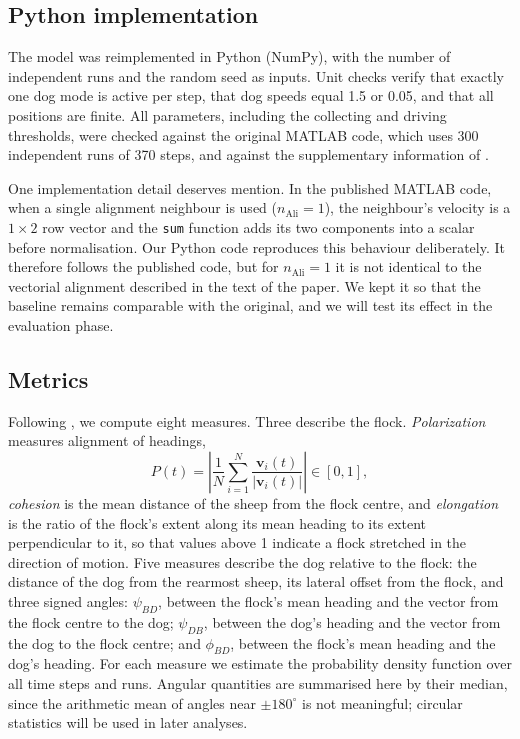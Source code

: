 \documentclass[9pt,twoside]{pnas-new}
\begin{document}
\subsection{Python implementation}
The model was reimplemented in Python (NumPy), with the number of independent runs and the random seed as inputs. Unit checks verify that exactly one dog mode is active per step, that dog speeds equal 1.5 or 0.05, and that all positions are finite. All parameters, including the collecting and driving thresholds, were checked against the original MATLAB code, which uses 300 independent runs of 370 steps, and against the supplementary information of \cite{jadhav2024}.

One implementation detail deserves mention. In the published MATLAB code, when a single alignment neighbour is used ($n_\mathrm{Ali}=1$), the neighbour's velocity is a $1\times2$ row vector and the \texttt{sum} function adds its two components into a scalar before normalisation. Our Python code reproduces this behaviour deliberately. It therefore follows the published code, but for $n_\mathrm{Ali}=1$ it is not identical to the vectorial alignment described in the text of the paper. We kept it so that the baseline remains comparable with the original, and we will test its effect in the evaluation phase.

\subsection{Metrics}
Following \cite{jadhav2024}, we compute eight measures. Three describe the flock. \emph{Polarization} measures alignment of headings,
\begin{equation}
P(t)=\left|\frac{1}{N}\sum_{i=1}^{N}\frac{\mathbf{v}_i(t)}{|\mathbf{v}_i(t)|}\right|\in[0,1],
\end{equation}
\emph{cohesion} is the mean distance of the sheep from the flock centre, and \emph{elongation} is the ratio of the flock's extent along its mean heading to its extent perpendicular to it, so that values above 1 indicate a flock stretched in the direction of motion. Five measures describe the dog relative to the flock: the distance of the dog from the rearmost sheep, its lateral offset from the flock, and three signed angles: $\psi_{BD}$, between the flock's mean heading and the vector from the flock centre to the dog; $\psi_{DB}$, between the dog's heading and the vector from the dog to the flock centre; and $\phi_{BD}$, between the flock's mean heading and the dog's heading. For each measure we estimate the probability density function over all time steps and runs. Angular quantities are summarised here by their median, since the arithmetic mean of angles near $\pm180^\circ$ is not meaningful; circular statistics will be used in later analyses.
\end{document}
